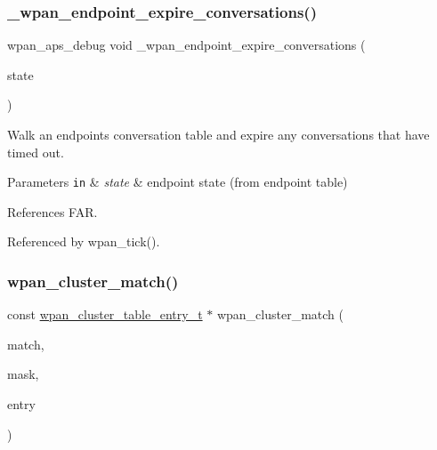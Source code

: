 \subsubsection{\texorpdfstring{\+\_\+wpan\+\_\+endpoint\+\_\+expire\+\_\+conversations()}{\_wpan\_endpoint\_expire\_conversations()}}
{\footnotesize\ttfamily wpan\+\_\+aps\+\_\+debug void \+\_\+wpan\+\_\+endpoint\+\_\+expire\+\_\+conversations (\begin{DoxyParamCaption}\item[{\hyperlink{structwpan__ep__state__t}{wpan\+\_\+ep\+\_\+state\+\_\+t} \hyperlink{group__hal_gaef060b3456fdcc093a7210a762d5f2ed}{F\+AR} $\ast$}]{state }\end{DoxyParamCaption})}



Walk an endpoint\textquotesingle{}s conversation table and expire any conversations that have timed out. 


\begin{DoxyParams}[1]{Parameters}
\mbox{\tt in}  & {\em state} & endpoint state (from endpoint table) \\
\hline
\end{DoxyParams}


References F\+AR.



Referenced by wpan\+\_\+tick().

\mbox{\label{group__wpan__aps_ga1c725384b21faf5953683d7b028c7be3}} 
\subsubsection{\texorpdfstring{wpan\+\_\+cluster\+\_\+match()}{wpan\_cluster\_match()}}
{\footnotesize\ttfamily const \hyperlink{structwpan__cluster__table__entry__t}{wpan\+\_\+cluster\+\_\+table\+\_\+entry\+\_\+t} $\ast$ wpan\+\_\+cluster\+\_\+match (\begin{DoxyParamCaption}\item[{\hyperlink{group__hal__dos_ga5a8b2dc9e45a9ee81a94ef304fb62505}{uint16\+\_\+t}}]{match,  }\item[{\hyperlink{group__hal__dos_gae1affc9ca37cfb624959c866a73f83c2}{uint8\+\_\+t}}]{mask,  }\item[{const \hyperlink{structwpan__cluster__table__entry__t}{wpan\+\_\+cluster\+\_\+table\+\_\+entry\+\_\+t} $\ast$}]{entry }\end{DoxyParamCaption})}



